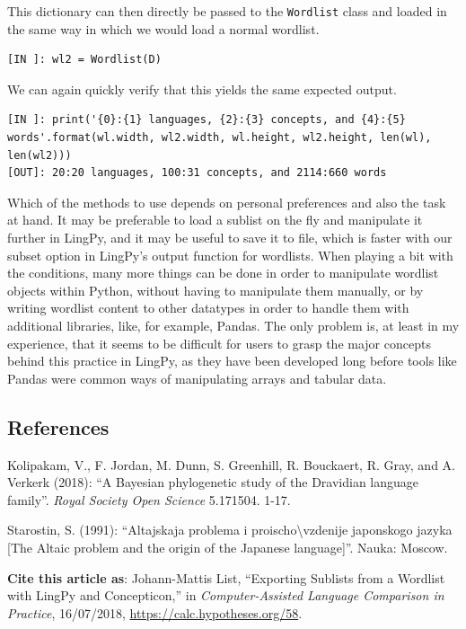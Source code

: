 \documentclass[
  english,
  a4paper,
  oneside,tablecaptionabove
]{scrbook}
\newcommand{\passthrough}[1]{#1}
\begin{document}
This dictionary can then directly be passed to the
\passthrough{\lstinline!Wordlist!} class and loaded in the same way in
which we would load a normal wordlist.

\begin{lstlisting}
[IN ]: wl2 = Wordlist(D)
\end{lstlisting}

We can again quickly verify that this yields the same expected output.

\begin{lstlisting}
[IN ]: print('{0}:{1} languages, {2}:{3} concepts, and {4}:{5} words'.format(wl.width, wl2.width, wl.height, wl2.height, len(wl), len(wl2))) 
[OUT]: 20:20 languages, 100:31 concepts, and 2114:660 words
\end{lstlisting}

Which of the methods to use depends on personal preferences and also the
task at hand. It may be preferable to load a sublist on the fly and
manipulate it further in LingPy, and it may be useful to save it to
file, which is faster with our subset option in LingPy's output function
for wordlists. When playing a bit with the conditions, many more things
can be done in order to manipulate wordlist objects within Python,
without having to manipulate them manually, or by writing wordlist
content to other datatypes in order to handle them with additional
libraries, like, for example, Pandas. The only problem is, at least in
my experience, that it seems to be difficult for users to grasp the
major concepts behind this practice in LingPy, as they have been
developed long before tools like Pandas were common ways of manipulating
arrays and tabular data.

\hypertarget{references}{\subsection*{References}\label{references}}

Kolipakam, V., F. Jordan, M. Dunn, S. Greenhill, R. Bouckaert, R.
Gray, and A. Verkerk (2018): ``A Bayesian phylogenetic study of
the Dravidian language family''. \emph{Royal Society Open Science}
5.171504. 1-17.

Starostin, S. (1991): ``Altajskaja problema i
proischo\textbackslash{}vzdenije japonskogo jazyka {[}The Altaic problem
and the origin of the Japanese language{]}''. Nauka: Moscow.

\textbf{Cite this article as}: Johann-Mattis List, ``Exporting Sublists
from a Wordlist with LingPy and Concepticon,'' in \emph{Computer-Assisted
Language Comparison in Practice}, 16/07/2018,
\url{https://calc.hypotheses.org/58}.
\end{document}
